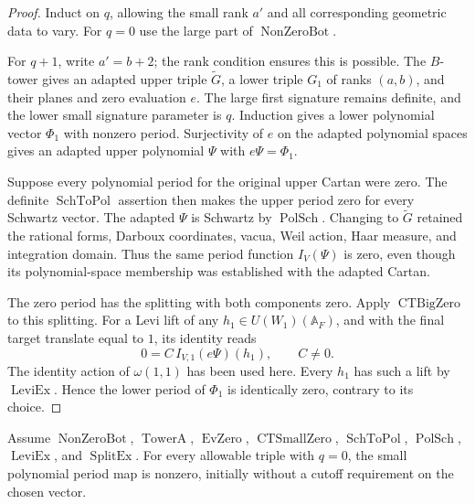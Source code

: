 \begin{proof}
Induct on \(q\), allowing the small rank \(a'\) and all
corresponding geometric data to vary.
For \(q=0\) use the large part of \(\operatorname{NonZeroBot}\).

For \(q+1\), write \(a'=b+2\); the rank condition ensures
this is possible. The \(B\)-tower gives an adapted upper
triple \(\widetilde G\), a lower triple \(G_1\) of ranks
\((a,b)\), and their planes and zero evaluation \(e\).
The large first signature remains definite, and the lower
small signature parameter is \(q\).
Induction gives a lower polynomial vector \(\Phi_1\)
with nonzero period.
Surjectivity of \(e\) on the adapted polynomial spaces
gives an adapted upper polynomial \(\Psi\) with
\(e\Psi=\Phi_1\).

Suppose every polynomial period for the original upper
Cartan were zero.
The definite \(\operatorname{SchToPol}\) assertion then makes
the upper period zero for every Schwartz vector.
The adapted \(\Psi\) is Schwartz by \(\operatorname{PolSch}\).
Changing to \(\widetilde G\) retained the rational forms,
Darboux coordinates, vacua, Weil action, Haar measure,
and integration domain. Thus the same period function
\(I_V(\Psi)\) is zero, even though its polynomial-space
membership was established with the adapted Cartan.

The zero period has the splitting with both components zero.
Apply \(\operatorname{CTBigZero}\) to this splitting.
For a Levi lift of any \(h_1\in U(W_1)(\mathbb A_F)\),
and with the final target translate equal to \(1\),
its identity reads
\[
                       0=C\,I_{V,1}(e\Psi)(h_1),
                              \qquad C\ne0.
\]
The identity action of \(\omega(1,1)\) has been used here.
Every \(h_1\) has such a lift by \(\operatorname{LeviEx}\).
Hence the lower period of \(\Phi_1\) is identically zero,
contrary to its choice.
\end{proof}

\begin{srlemma}
\label{lem:sr-source-small-nonzero}
Assume \(\operatorname{NonZeroBot}\),
\(\operatorname{TowerA}\), \(\operatorname{EvZero}\),
\(\operatorname{CTSmallZero}\), \(\operatorname{SchToPol}\),
\(\operatorname{PolSch}\), \(\operatorname{LeviEx}\), and
\(\operatorname{SplitEx}\).
For every allowable triple with \(q=0\), the small polynomial
period map is nonzero, initially without a cutoff requirement
on the chosen vector.
\end{srlemma}

